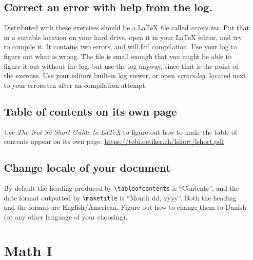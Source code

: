 \documentclass[a4paper, 12pt]{article}
\begin{document}
\subsection{Correct an error with help from the log.}
Distributed with these exercises should be a LaTeX file called \emph{errors.tex}. Put that in a suitable location on your hard drive, open it in your LaTeX editor, and try to compile it. It contains two errors, and will fail compilation. Use your log to figure out what is wrong. The file is small enough that you might be able to figure it out without the log, but use the log anyway, since that is the point of the exercise. Use your editors built-in log viewer, or open \emph{errors.log}, located next to your errors.tex after an compilation attempt.

\subsection{Table of contents on its own page}
Use \emph{The Not So Short Guide to \LaTeX{}} to figure out how to make the table of contents appear on its own page.
\url{https://tobi.oetiker.ch/lshort/lshort.pdf}

\subsection{Change locale of your document}
By default the heading produced  by \verb!\tableofcontents! is ``Contents'', and the date format outputted by \verb!\maketitle! is ``Month dd, yyyy''. Both the heading and the format are English/American. Figure out how to change them to Danish (or any other language of your choosing).

\section{Math I}
\end{document}

